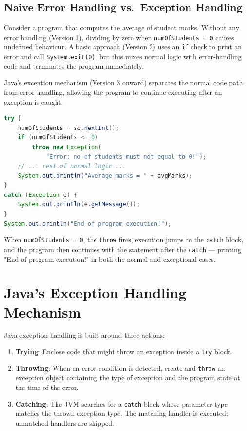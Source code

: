 \documentclass[11pt, a4paper, notitlepage]{report}
\theoremstyle{definition}
\theoremstyle{remark}
\theoremstyle{definition}
\begin{document}
\subsection{Naive Error Handling vs.\ Exception Handling}
\label{sec:ch4-naive-vs-exception}

Consider a program that computes the average of student marks. Without any error handling (Version 1), dividing by zero when \texttt{numOfStudents = 0} causes undefined behaviour. A basic approach (Version 2) uses an \texttt{if} check to print an error and call \texttt{System.exit(0)}, but this mixes normal logic with error-handling code and terminates the program immediately.

Java's exception mechanism (Version 3 onward) separates the normal code path from error handling, allowing the program to continue executing after an exception is caught:

\begin{lstlisting}[language=Java]
try {
    numOfStudents = sc.nextInt();
    if (numOfStudents <= 0)
        throw new Exception(
            "Error: no of students must not equal to 0!");
    // ... rest of normal logic ...
    System.out.println("Average marks = " + avgMarks);
}
catch (Exception e) {
    System.out.println(e.getMessage());
}
System.out.println("End of program execution!");
\end{lstlisting}

When \texttt{numOfStudents = 0}, the \texttt{throw} fires, execution jumps to the \texttt{catch} block, and the program then continues with the statement after the \texttt{catch} --- printing "End of program execution!" in both the normal and exceptional cases.

\section{Java's Exception Handling Mechanism}
\label{sec:ch4-mechanism}

Java exception handling is built around three actions:

\begin{enumerate}
  \item \textbf{Trying}: Enclose code that might throw an exception inside a \texttt{try} block.
  \item \textbf{Throwing}: When an error condition is detected, create and \texttt{throw} an exception object containing the type of exception and the program state at the time of the error.
  \item \textbf{Catching}: The JVM searches for a \texttt{catch} block whose parameter type matches the thrown exception type. The matching handler is executed; unmatched handlers are skipped.
\end{enumerate}
\end{document}
